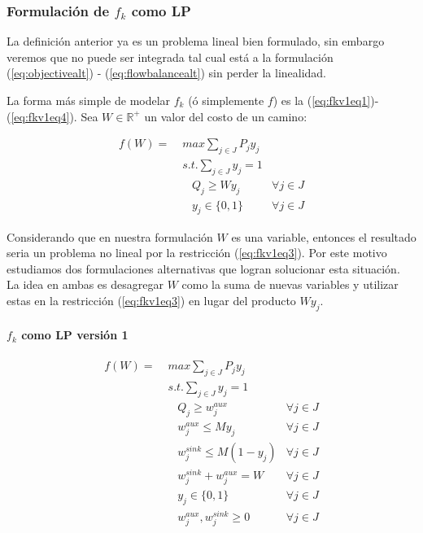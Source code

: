 \documentclass{article}
\begin{document}
  \subsubsection{Formulación de $f_k$ como LP}

  La definición anterior ya es un problema lineal bien formulado, sin embargo veremos que no puede ser integrada tal cual está a la formulación (\ref{eq:objectivealt}) - (\ref{eq:flowbalancealt}) sin perder la linealidad.

  La forma más simple de modelar $f_k$ (ó simplemente $f$) es la (\ref{eq:fkv1eq1})-(\ref{eq:fkv1eq4}). Sea $W \in \mathbb{R}^+$ un valor del costo de un camino:

  \begin{align}
    f(W) =\; & max \sum_{j \in J} P_j y_j    & \label{eq:fkv1eq1}\\
             & s.t. \sum_{j \in J} y_j = 1   & \label{eq:fkv1eq2} \\
             & \;\;\; Q_j \geq W y_j         & \label{eq:fkv1eq3} \forall j \in J \\
             & \;\;\; y_j \in \{0,1\}        & \label{eq:fkv1eq4} \forall j \in J
  \end{align}

  Considerando que en nuestra formulación $W$ es una variable, entonces el resultado seria un problema no lineal por la restricción (\ref{eq:fkv1eq3}). Por este motivo estudiamos dos formulaciones alternativas que logran solucionar esta situación. La idea en ambas es desagregar $W$ como la suma de nuevas variables y utilizar estas en la restricción (\ref{eq:fkv1eq3}) en lugar del producto $W y_j$.

  \paragraph*{$f_k$ como LP versión 1}

  \begin{align}
    f(W) =\; & max \sum_{j \in J} P_j y_j             & \label{eq:fkv3eq1}\\
             & s.t. \sum_{j \in J} y_j = 1            & \label{eq:fkv3eq2}\\
             & \;\;\; Q_j \geq w^{aux}_j              & \forall j \in J \label{eq:fkv3eq3} \\
             & \;\;\; w^{aux}_j \leq M y_j            & \forall j \in J \label{eq:fkv3eq4} \\
             & \;\;\; w^{sink}_j \leq M (1 - y_j)     & \forall j \in J \label{eq:fkv3eq5} \\
             & \;\;\; w^{sink}_j + w^{aux}_j = W      & \label{eq:fkv3eq6} \forall j \in J\\
             & \;\;\; y_j \in \{0,1\}                 & \label{eq:fkv3domainy} \forall j \in J \\
             & \;\;\; w^{aux}_j, w^{sink}_j \geq 0    & \label{eq:fkv3eq7} \forall j \in J
  \end{align}
\end{document}
